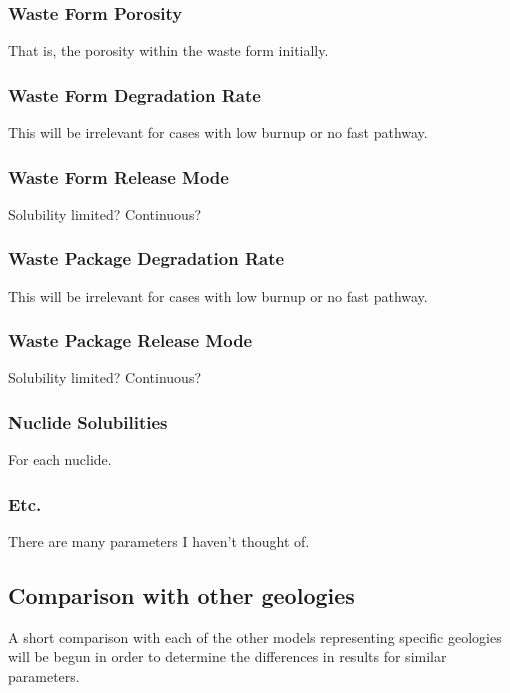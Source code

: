 \subsubsection{Waste Form Porosity}

That is, the porosity within the waste form initially.

\subsubsection{Waste Form Degradation Rate}

This will be irrelevant for cases with low burnup or no fast pathway. 

\subsubsection{Waste Form Release Mode}

Solubility limited? Continuous?

\subsubsection{Waste Package Degradation Rate}

This will be irrelevant for cases with low burnup or no fast pathway. 

\subsubsection{Waste Package Release Mode}

Solubility limited? Continuous?

\subsubsection{Nuclide Solubilities}

For each nuclide.

\subsubsection{Etc. }

There are many parameters I haven't thought of.

\subsection{Comparison with other geologies}

A short comparison with each of the other models representing specific geologies 
will be begun in order to determine the differences in results for similar 
parameters.


